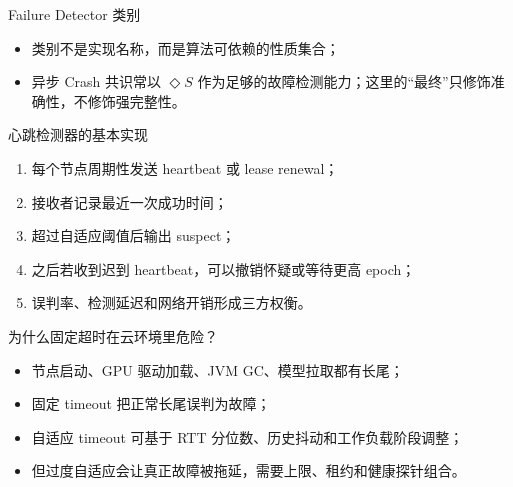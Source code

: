\documentclass[UTF8,fontset=none,aspectratio=169,10pt]{beamer}
\begin{document}
\begin{frame}{Failure Detector 类别}
\begin{center}
\end{center}
\begin{itemize}
  \item 类别不是实现名称，而是算法可依赖的性质集合；
  \item 异步 Crash 共识常以 $\Diamond S$ 作为足够的故障检测能力；这里的“最终”只修饰准确性，不修饰强完整性。
\end{itemize}
\end{frame}

\begin{frame}{心跳检测器的基本实现}
\begin{enumerate}
  \item 每个节点周期性发送 heartbeat 或 lease renewal；
  \item 接收者记录最近一次成功时间；
  \item 超过自适应阈值后输出 suspect；
  \item 之后若收到迟到 heartbeat，可以撤销怀疑或等待更高 epoch；
  \item 误判率、检测延迟和网络开销形成三方权衡。
\end{enumerate}
\end{frame}

\begin{frame}{为什么固定超时在云环境里危险？}
\begin{itemize}
  \item 节点启动、GPU 驱动加载、JVM GC、模型拉取都有长尾；
  \item 固定 timeout 把正常长尾误判为故障；
  \item 自适应 timeout 可基于 RTT 分位数、历史抖动和工作负载阶段调整；
  \item 但过度自适应会让真正故障被拖延，需要上限、租约和健康探针组合。
\end{itemize}
\end{frame}
\end{document}
